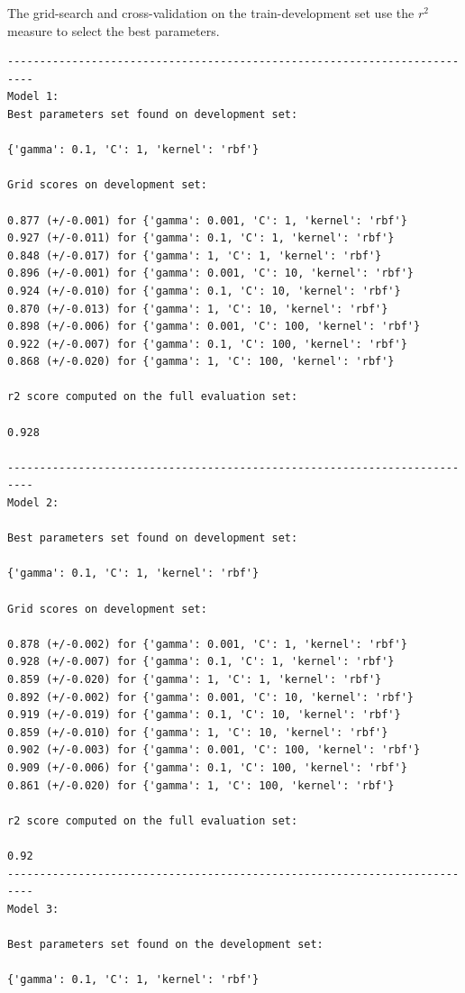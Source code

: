 The grid-search and cross-validation on the train-development set use the $r^2$ measure to select the best parameters. 

\begin{verbatim}
--------------------------------------------------------------------------
Model 1:
Best parameters set found on development set:

{'gamma': 0.1, 'C': 1, 'kernel': 'rbf'}

Grid scores on development set:

0.877 (+/-0.001) for {'gamma': 0.001, 'C': 1, 'kernel': 'rbf'}
0.927 (+/-0.011) for {'gamma': 0.1, 'C': 1, 'kernel': 'rbf'}
0.848 (+/-0.017) for {'gamma': 1, 'C': 1, 'kernel': 'rbf'}
0.896 (+/-0.001) for {'gamma': 0.001, 'C': 10, 'kernel': 'rbf'}
0.924 (+/-0.010) for {'gamma': 0.1, 'C': 10, 'kernel': 'rbf'}
0.870 (+/-0.013) for {'gamma': 1, 'C': 10, 'kernel': 'rbf'}
0.898 (+/-0.006) for {'gamma': 0.001, 'C': 100, 'kernel': 'rbf'}
0.922 (+/-0.007) for {'gamma': 0.1, 'C': 100, 'kernel': 'rbf'}
0.868 (+/-0.020) for {'gamma': 1, 'C': 100, 'kernel': 'rbf'}

r2 score computed on the full evaluation set:

0.928

--------------------------------------------------------------------------
Model 2:

Best parameters set found on development set:

{'gamma': 0.1, 'C': 1, 'kernel': 'rbf'}

Grid scores on development set:

0.878 (+/-0.002) for {'gamma': 0.001, 'C': 1, 'kernel': 'rbf'}
0.928 (+/-0.007) for {'gamma': 0.1, 'C': 1, 'kernel': 'rbf'}
0.859 (+/-0.020) for {'gamma': 1, 'C': 1, 'kernel': 'rbf'}
0.892 (+/-0.002) for {'gamma': 0.001, 'C': 10, 'kernel': 'rbf'}
0.919 (+/-0.019) for {'gamma': 0.1, 'C': 10, 'kernel': 'rbf'}
0.859 (+/-0.010) for {'gamma': 1, 'C': 10, 'kernel': 'rbf'}
0.902 (+/-0.003) for {'gamma': 0.001, 'C': 100, 'kernel': 'rbf'}
0.909 (+/-0.006) for {'gamma': 0.1, 'C': 100, 'kernel': 'rbf'}
0.861 (+/-0.020) for {'gamma': 1, 'C': 100, 'kernel': 'rbf'}

r2 score computed on the full evaluation set:

0.92
--------------------------------------------------------------------------
Model 3:

Best parameters set found on the development set:

{'gamma': 0.1, 'C': 1, 'kernel': 'rbf'}


\end{verbatim}
